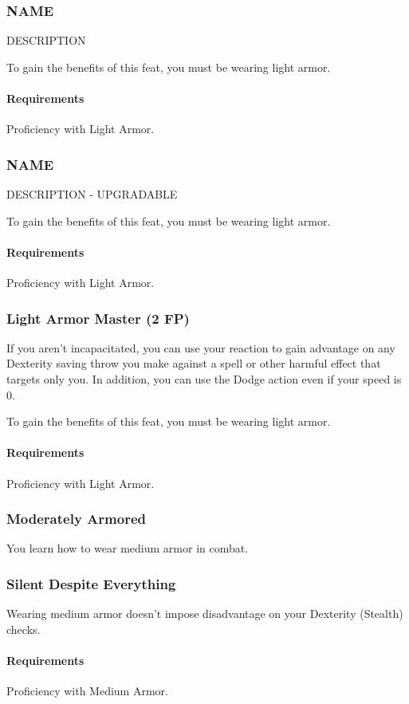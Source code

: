 \subsubsection{NAME} \label{feat::name}
    DESCRIPTION

    To gain the benefits of this feat, you must be wearing light armor.
    \paragraph{Requirements} Proficiency with Light Armor.
\subsubsection{NAME} \label{feat::name}
    DESCRIPTION - UPGRADABLE

    To gain the benefits of this feat, you must be wearing light armor.
    \paragraph{Requirements} Proficiency with Light Armor.
\subsubsection{Light Armor Master (2 FP)} \label{feat::lightarmormaster}
    If you aren't incapacitated, you can use your reaction to gain advantage on any Dexterity saving throw you make against a spell or other harmful effect that targets only you.
    In addition, you can use the Dodge action even if your speed is 0.

    To gain the benefits of this feat, you must be wearing light armor.
    \paragraph{Requirements} Proficiency with Light Armor.
\subsubsection{Moderately Armored} \label{feat::moderatelyarmored}
    You learn how to wear medium armor in combat.
\subsubsection{Silent Despite Everything} \label{feat::silentdespiteeverything}
    Wearing medium armor doesn't impose disadvantage on your Dexterity (Stealth) checks.
    \paragraph{Requirements} Proficiency with Medium Armor.
